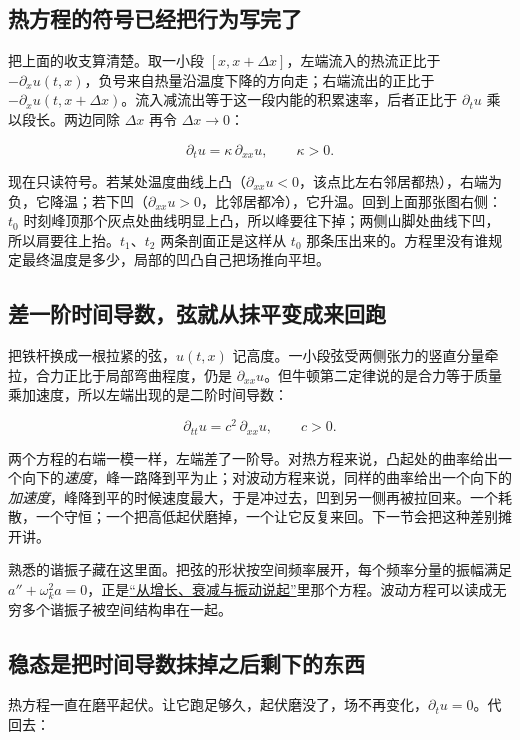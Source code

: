 \subsection{热方程的符号已经把行为写完了}

把上面的收支算清楚。取一小段 \([x,x+\Delta x]\)，左端流入的热流正比于 \(-\partial_xu(t,x)\)，负号来自热量沿温度下降的方向走；右端流出的正比于 \(-\partial_xu(t,x+\Delta x)\)。流入减流出等于这一段内能的积累速率，后者正比于 \(\partial_tu\) 乘以段长。两边同除 \(\Delta x\) 再令 \(\Delta x\to0\)：

\[
\partial_t u=\kappa\,\partial_{xx}u,
\qquad \kappa>0 .
\]

现在只读符号。若某处温度曲线上凸（\(\partial_{xx}u<0\)，该点比左右邻居都热），右端为负，它降温；若下凹（\(\partial_{xx}u>0\)，比邻居都冷），它升温。回到上面那张图右侧：\(t_0\) 时刻峰顶那个灰点处曲线明显上凸，所以峰要往下掉；两侧山脚处曲线下凹，所以肩要往上抬。\(t_1\)、\(t_2\) 两条剖面正是这样从 \(t_0\) 那条压出来的。方程里没有谁规定最终温度是多少，局部的凹凸自己把场推向平坦。

\subsection{差一阶时间导数，弦就从抹平变成来回跑}

把铁杆换成一根拉紧的弦，\(u(t,x)\) 记高度。一小段弦受两侧张力的竖直分量牵拉，合力正比于局部弯曲程度，仍是 \(\partial_{xx}u\)。但牛顿第二定律说的是合力等于质量乘加速度，所以左端出现的是二阶时间导数：

\[
\partial_{tt}u=c^2\,\partial_{xx}u,
\qquad c>0 .
\]

两个方程的右端一模一样，左端差了一阶导。对热方程来说，凸起处的曲率给出一个向下的\emph{速度}，峰一路降到平为止；对波动方程来说，同样的曲率给出一个向下的\emph{加速度}，峰降到平的时候速度最大，于是冲过去，凹到另一侧再被拉回来。一个耗散，一个守恒；一个把高低起伏磨掉，一个让它反复来回。下一节会把这种差别摊开讲。

熟悉的谐振子藏在这里面。把弦的形状按空间频率展开，每个频率分量的振幅满足 \(a''+\omega_k^2a=0\)，正是\hyperref[sec:15-Differential-Equations-and-Dynamical-Systems/01-ODE-Theory/01]{``从增长、衰减与振动说起''}里那个方程。波动方程可以读成无穷多个谐振子被空间结构串在一起。

\subsection{稳态是把时间导数抹掉之后剩下的东西}

热方程一直在磨平起伏。让它跑足够久，起伏磨没了，场不再变化，\(\partial_tu=0\)。代回去：

